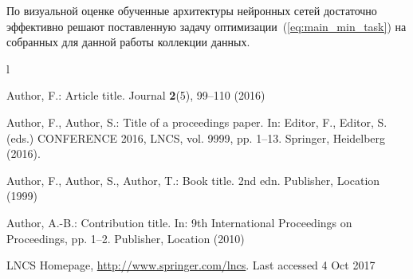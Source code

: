 \documentclass[runningheads]{llncs}
\begin{document}
По визуальной оценке обученные архитектуры нейронных сетей достаточно эффективно решают поставленную задачу оптимизации~(\ref{eq:main_min_task}) на собранных для данной работы коллекции данных.


l%


%
%
%
% 
% 
%
\begin{thebibliography}{8}
Author, F.: Article title. Journal \textbf{2}(5), 99--110 (2016)

Author, F., Author, S.: Title of a proceedings paper. In: Editor,
F., Editor, S. (eds.) CONFERENCE 2016, LNCS, vol. 9999, pp. 1--13.
Springer, Heidelberg (2016). 

Author, F., Author, S., Author, T.: Book title. 2nd edn. Publisher,
Location (1999)

Author, A.-B.: Contribution title. In: 9th International Proceedings
on Proceedings, pp. 1--2. Publisher, Location (2010)

LNCS Homepage, \url{http://www.springer.com/lncs}. Last accessed 4
Oct 2017
\end{thebibliography}
\end{document}
